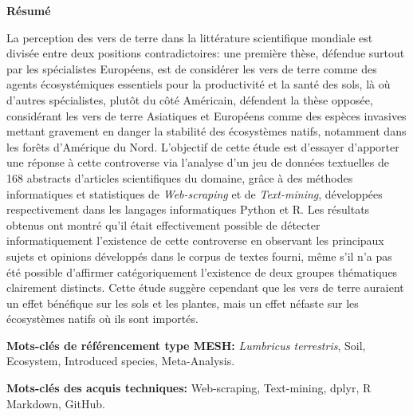 \documentclass{book}
\begin{document}

\newpage
\thispagestyle{empty}
\begin{center}
    \huge{\textbf{Résumé}}
\end{center}

\vspace{1cm}
\noindent
La perception des vers de terre dans la littérature scientifique mondiale est divisée entre deux positions contradictoires: une première thèse, défendue surtout par les spécialistes Européens, est de considérer les vers de terre comme des agents écosystémiques essentiels pour la productivité et la santé des sols, là où d'autres spécialistes, plutôt du côté Américain, défendent la thèse opposée, considérant les vers de terre Asiatiques et Européens comme des espèces invasives mettant gravement en danger la stabilité des écosystèmes natifs, notamment dans les forêts d'Amérique du Nord. L'objectif de cette étude est d'essayer d'apporter une réponse à cette controverse via l'analyse d'un jeu de données textuelles de 168 abstracts d'articles scientifiques du domaine, grâce à des méthodes informatiques et statistiques de \textit{Web-scraping} et de \textit{Text-mining}, développées respectivement dans les langages informatiques Python et R. Les résultats obtenus ont montré qu'il était effectivement possible de détecter informatiquement l'existence de cette controverse en observant les principaux sujets et opinions développés dans le corpus de textes fourni, même s'il n'a pas été possible d'affirmer catégoriquement l'existence de deux groupes thématiques clairement distincts. Cette étude suggère cependant que les vers de terre auraient un effet bénéfique sur les sols et les plantes, mais un effet néfaste sur les écosystèmes natifs où ils sont importés. 

\vspace{\baselineskip} %
\par
\textbf{Mots-clés de référencement type MESH:} \textit{Lumbricus terrestris}, Soil, Ecosystem, Introduced species, Meta-Analysis.
\vspace{\baselineskip} %
\par
\textbf{Mots-clés des acquis techniques:} Web-scraping, Text-mining, dplyr, R Markdown, GitHub.
\end{document}
